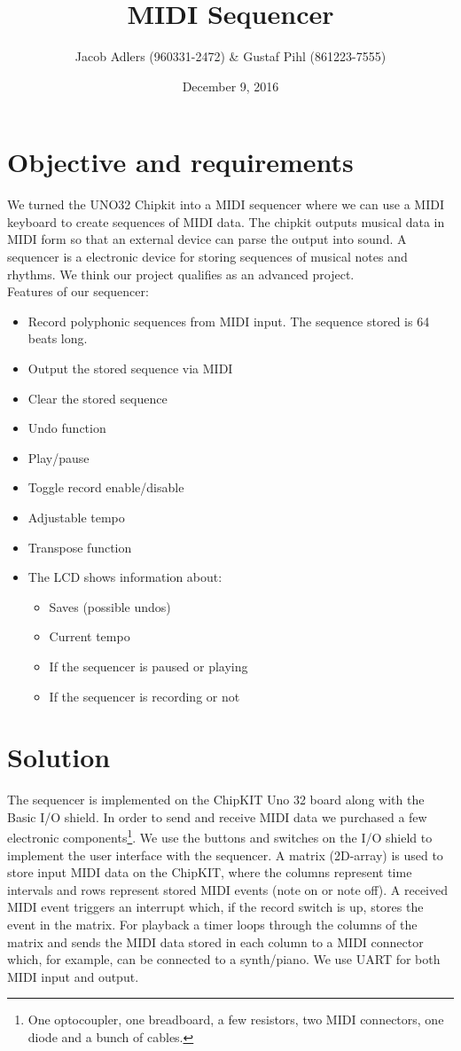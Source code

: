 \documentclass[a4paper,10pt]{article}
\title{MIDI Sequencer}
\author{Jacob Adlers (960331-2472) & Gustaf Pihl (861223-7555)}
\date{December 9, 2016}
\begin{document}
\maketitle

\section{Objective and requirements}

We turned the UNO32 Chipkit into a MIDI sequencer where we can use a MIDI keyboard to create sequences of MIDI data. The chipkit outputs musical data in MIDI form so that an external device can parse the output into sound. A sequencer is a electronic device for storing sequences of musical notes and rhythms. We think our project qualifies as an advanced project.\\

Features of our sequencer:
\begin{itemize}
  \item Record polyphonic sequences from MIDI input. The sequence stored is 64 beats long.
  \item Output the stored sequence via MIDI
  \item Clear the stored sequence
  \item Undo function
  \item Play/pause
  \item Toggle record enable/disable
  \item Adjustable tempo
  \item Transpose function
  \item The LCD shows information about:
  \begin{itemize}
      \item Saves (possible undos)
      \item Current tempo
      \item If the sequencer is paused or playing
      \item If the sequencer is recording or not
  \end{itemize}
\end{itemize}



\section{Solution}
The sequencer is implemented on the ChipKIT Uno 32 board along with the Basic I/O shield. In order to send and receive MIDI data we purchased a few electronic components\footnote{One optocoupler, one breadboard, a few resistors, two MIDI connectors, one diode and a bunch of cables.}. We use the buttons and switches on the I/O shield to implement the user interface with the sequencer. A matrix (2D-array) is used to store input MIDI data on the ChipKIT, where the columns represent time intervals and rows represent stored MIDI events (note on or note off). A received MIDI event triggers an interrupt which, if the record switch is up, stores the event in the matrix. For playback a timer loops through the columns of the matrix and sends the MIDI data stored in each column to a MIDI connector which, for example, can be connected to a synth/piano. We use UART for both MIDI input and output.
\end{document}
